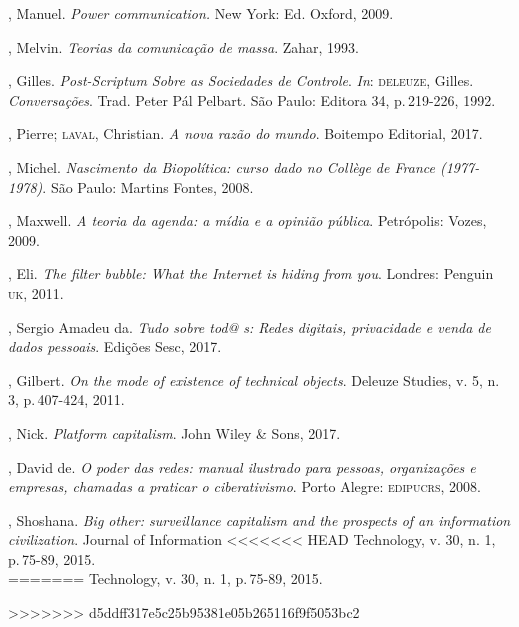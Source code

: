 
\begin{bibliohedra}
, Manuel. \emph{Power communication.} New York: Ed. Oxford,
2009.

, Melvin. \emph{Teorias da comunicação de massa}. Zahar, 1993.

, Gilles. \emph{Post-Scriptum Sobre as Sociedades de Controle}. \emph{In}:
\textsc{deleuze}, Gilles. \emph{Conversações}. Trad. Peter Pál Pelbart. São Paulo:
Editora 34, p.\,219-226, 1992.

, Pierre; \textsc{laval}, Christian. \emph{A nova razão do mundo}.
Boitempo Editorial, 2017.

, Michel. \emph{Nascimento da Biopolítica: curso dado no
Collège de France (1977-1978)}. São Paulo: Martins Fontes, 2008.

, Maxwell. \emph{A teoria da agenda: a mídia e a opinião
pública}. Petrópolis: Vozes, 2009.

, Eli. \emph{The filter bubble: What the Internet is hiding
from you}. Londres: Penguin \textsc{uk}, 2011.

, Sergio Amadeu da. \emph{Tudo sobre tod@ s: Redes digitais,
privacidade e venda de dados pessoais}. Edições Sesc, 2017.

, Gilbert. \emph{On the mode of existence of technical
objects}. Deleuze Studies, v. 5, n. 3, p.\,407-424, 2011.

, Nick. \emph{Platform capitalism}. John Wiley \& Sons, 2017.

, David de. \emph{O poder das redes: manual ilustrado para
pessoas, organizações e empresas, chamadas a praticar o ciberativismo}.
Porto Alegre: \textsc{edipucrs}, 2008.

, Shoshana. \emph{Big other: surveillance capitalism and the
prospects of an information civilization}. Journal of Information
<<<<<<< HEAD
Technology, v. 30, n. 1, p.\,75-89, 2015.\\
=======
Technology, v. 30, n. 1, p.\,75-89, 2015.
\end{bibliohedra}
>>>>>>> d5ddff317e5c25b95381e05b265116f9f5053bc2

